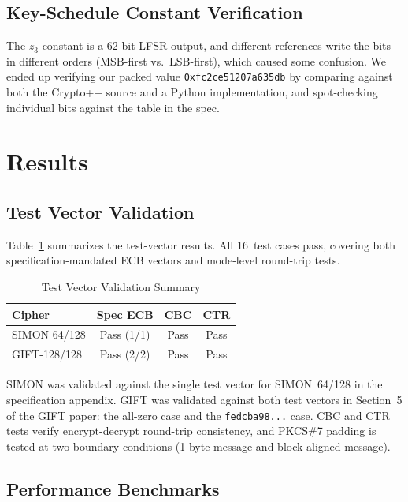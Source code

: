 \documentclass[conference]{IEEEtran}
\begin{document}
\subsection{Key-Schedule Constant Verification}

The $z_3$ constant is a 62-bit LFSR output, and different references
write the bits in different orders (MSB-first vs.\ LSB-first), which
caused some confusion.  We ended up verifying our packed value
\texttt{0xfc2ce51207a635db} by comparing against both the Crypto++
source and a Python implementation, and spot-checking individual bits
against the table in the spec.

\section{Results}

\subsection{Test Vector Validation}

Table~\ref{tab:vectors} summarizes the test-vector results.  All 16~test
cases pass, covering both specification-mandated ECB vectors and
mode-level round-trip tests.

\begin{table}[htbp]
\caption{Test Vector Validation Summary}
\label{tab:vectors}
\centering
\begin{tabular}{lccc}
\toprule
\textbf{Cipher} & \textbf{Spec ECB} & \textbf{CBC} & \textbf{CTR} \\
\midrule
SIMON 64/128 & Pass (1/1) & Pass & Pass \\
GIFT-128/128 & Pass (2/2) & Pass & Pass \\
\bottomrule
\end{tabular}
\end{table}

SIMON was validated against the single test vector for SIMON~64/128 in the
specification appendix.  GIFT was validated against both test vectors in
Section~5 of the GIFT paper: the all-zero case and the
\texttt{fedcba98...} case.  CBC and CTR tests verify encrypt-decrypt
round-trip consistency, and PKCS\#7 padding is tested at two boundary
conditions (1-byte message and block-aligned message).

\subsection{Performance Benchmarks}
\end{document}
